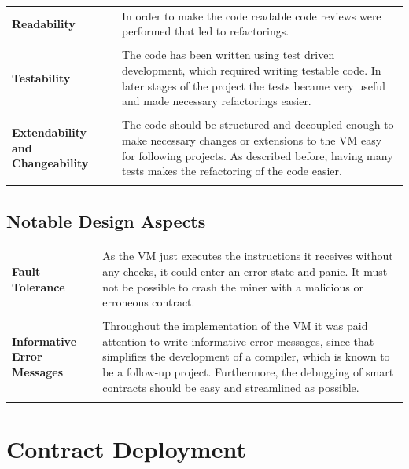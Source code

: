 \begin{tabular}[t]{ p{3cm} p{12.5cm}}
\raggedright
\textbf{Readability} &
In order to make the code readable code reviews were performed that led to refactorings. \\ \\

\raggedright
\textbf{Testability} &
The code has been written using test driven development, which required writing testable code. In later stages of the project the tests became very useful and made necessary refactorings easier. \\ \\
 
\raggedright
\textbf{Extendability and Changeability} &
The code should be structured and decoupled enough to make necessary changes or extensions to the VM easy for following projects. As described before, having many tests makes the refactoring of the code easier. \\ \\ 
\end{tabular}

\subsection{Notable Design Aspects}
\begin{tabular}[t]{ p{3cm} p{12.5cm}}
\raggedright
\textbf{Fault Tolerance} &
As the VM just executes the instructions it receives without any checks, it could enter an error state and \gls{panic}. It must not be possible to crash the miner with a malicious or erroneous contract. \\ \\

\textbf{Informative Error Messages} &
Throughout the implementation of the VM it was paid attention to write informative error messages, since that simplifies the development of a compiler, which is known to be a follow-up project. Furthermore, the debugging of smart contracts should be easy and streamlined as possible. \\ \\
\end{tabular}

\section{Contract Deployment}

